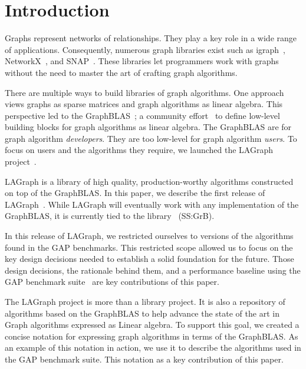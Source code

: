 \section{Introduction}
\label{sec:introduction}

Graphs represent networks of relationships. They play a key role in 
a wide range of applications.   Consequently, numerous graph libraries exist 
such as igraph~\cite{igraph}, NetworkX~\cite{DBLP:reference/snam/X18xv}, and SNAP~\cite{DBLP:journals/tist/LeskovecS16}.
These libraries let programmers work with graphs without the need to master the art of crafting graph algorithms.

There are multiple ways to build libraries of graph algorithms.  One approach
views graphs as sparse matrices and graph algorithms as
linear algebra. This perspective led to the 
GraphBLAS~\cite{DBLP:conf/hpec/MattsonBBBDFFGGHKLLPPRSWY13,DBLP:conf/hpec/MattsonYMBM17}; 
a community effort~\cite{GraphBLASforum} to define low-level building blocks for graph algorithms as linear algebra.
The GraphBLAS are for graph algorithm \emph{developers}.  They are too 
low-level for graph algorithm \emph{users}.  To focus on users and the 
algorithms they require, we launched the
LAGraph project~\cite{DBLP:conf/ipps/MattsonDKBMMY19}.  

LAGraph is a library 
of high quality, production-worthy algorithms constructed on top of
the GraphBLAS.  In this paper, we describe the first release of LAGraph~\cite{LAGraphRepo}.
While LAGraph will eventually work with any implementation of the GraphBLAS, it is currently tied to
the \ssgrb library~\cite{SuiteSparseGraphBLAS} (SS:GrB).

In this release of LAGraph, we restricted ourselves to versions of the algorithms found in the GAP benchmarks.
This restricted scope allowed us to focus on the key design decisions needed to establish a solid
foundation for the future.  Those design decisions, the rationale behind them, and a performance baseline 
using the GAP benchmark suite~\cite{DBLP:journals/corr/BeamerAP15} are key contributions of this paper.   

The LAGraph project is more than a library project.   It is also
a repository of algorithms based on the GraphBLAS to help advance the state of the art in 
Graph algorithms expressed as Linear algebra. To support this goal, we created a concise notation for expressing
graph algorithms in terms of the GraphBLAS.   As an example of this notation in action, we use it to describe 
the algorithms used in the GAP benchmark suite.  This notation as a key contribution of this paper.  


